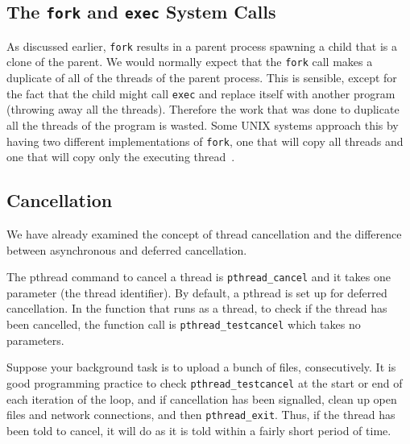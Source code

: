 \subsection*{The \texttt{fork} and \texttt{exec} System Calls} 
As discussed earlier, \texttt{fork} results in a parent process spawning a child that is a clone of the parent. We would normally expect that the \texttt{fork} call makes a duplicate of all of the threads of the parent process. This is sensible, except for the fact that the child might call \texttt{exec} and replace itself with another program (throwing away all the threads). Therefore the work that was done to duplicate all the threads of the program is wasted. Some UNIX systems approach this by having two different implementations of \texttt{fork}, one that will copy all threads and one that will copy only the executing thread~\cite{osc}.




\subsection*{Cancellation}

We have already examined the concept of thread cancellation and the difference between asynchronous and deferred cancellation.

The pthread command to cancel a thread is \texttt{pthread\_cancel} and it takes one parameter (the thread identifier). By default, a pthread is set up for deferred cancellation. In the function that runs as a thread, to check if the thread has been cancelled, the function call is \texttt{pthread\_testcancel} which takes no parameters.

Suppose your background task is to upload a bunch of files, consecutively. It is good programming practice to check \texttt{pthread\_testcancel} at the start or end of each iteration of the loop, and if cancellation has been signalled, clean up open files and network connections, and then \texttt{pthread\_exit}. Thus, if the thread has been told to cancel, it will do as it is told within a fairly short period of time.



